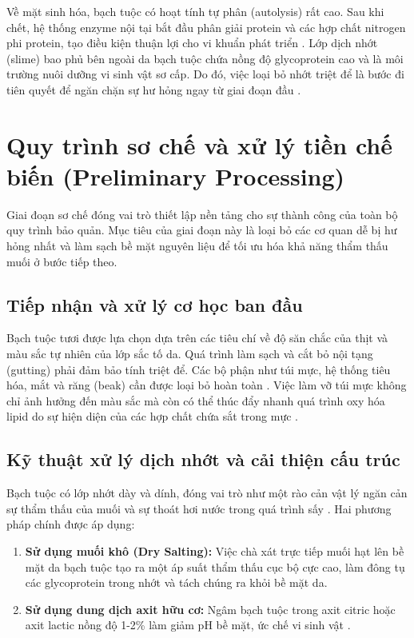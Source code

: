 \documentclass[12pt,a4paper]{report}
\begin{document}
Về mặt sinh hóa, bạch tuộc có hoạt tính tự phân (autolysis) rất cao. Sau khi chết, hệ thống enzyme nội tại bắt đầu phân giải protein và các hợp chất nitrogen phi protein, tạo điều kiện thuận lợi cho vi khuẩn phát triển \cite{octopus_oregano}. Lớp dịch nhớt (slime) bao phủ bên ngoài da bạch tuộc chứa nồng độ glycoprotein cao và là môi trường nuôi dưỡng vi sinh vật sơ cấp. Do đó, việc loại bỏ nhớt triệt để là bước đi tiên quyết để ngăn chặn sự hư hỏng ngay từ giai đoạn đầu \cite{squid_acids}.

\section{Quy trình sơ chế và xử lý tiền chế biến (Preliminary Processing)}

Giai đoạn sơ chế đóng vai trò thiết lập nền tảng cho sự thành công của toàn bộ quy trình bảo quản. Mục tiêu của giai đoạn này là loại bỏ các cơ quan dễ bị hư hỏng nhất và làm sạch bề mặt nguyên liệu để tối ưu hóa khả năng thẩm thấu muối ở bước tiếp theo.

\subsection{Tiếp nhận và xử lý cơ học ban đầu}

Bạch tuộc tươi được lựa chọn dựa trên các tiêu chí về độ săn chắc của thịt và màu sắc tự nhiên của lớp sắc tố da. Quá trình làm sạch và cắt bỏ nội tạng (gutting) phải đảm bảo tính triệt để. Các bộ phận như túi mực, hệ thống tiêu hóa, mắt và răng (beak) cần được loại bỏ hoàn toàn \cite{octopus_methods}. Việc làm vỡ túi mực không chỉ ảnh hưởng đến màu sắc mà còn có thể thúc đẩy nhanh quá trình oxy hóa lipid do sự hiện diện của các hợp chất chứa sắt trong mực \cite{lipid_storage}.

\subsection{Kỹ thuật xử lý dịch nhớt và cải thiện cấu trúc}

Bạch tuộc có lớp nhớt dày và dính, đóng vai trò như một rào cản vật lý ngăn cản sự thẩm thấu của muối và sự thoát hơi nước trong quá trình sấy \cite{squid_acids}. Hai phương pháp chính được áp dụng:

\begin{enumerate}
    \item \textbf{Sử dụng muối khô (Dry Salting):} Việc chà xát trực tiếp muối hạt lên bề mặt da bạch tuộc tạo ra một áp suất thẩm thấu cục bộ cực cao, làm đông tụ các glycoprotein trong nhớt và tách chúng ra khỏi bề mặt da.
    \item \textbf{Sử dụng dung dịch axit hữu cơ:} Ngâm bạch tuộc trong axit citric hoặc axit lactic nồng độ 1-2\% làm giảm pH bề mặt, ức chế vi sinh vật \cite{squid_acids}.
\end{enumerate}
\end{document}

